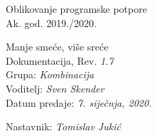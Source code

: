 \documentclass[12pt]{report}
\begin{document}
	
	\begin{titlepage}
		\begin{center}
			\LARGE Oblikovanje programske potpore\\
			\large Ak. god. 2019./2020.\\
			
			
			\huge Manje smeće, više sreće\\
			\Large Dokumentacija, Rev. \textit{1.7}\\
			
			\normalsize
			Grupa: \textit{Kombinacija}\\
			Voditelj: \textit{Sven Skender}\\
			
			
			Datum predaje: \textit{7. siječnja, 2020.}\\
			
			
			Nastavnik: \textit{Tomislav Jukić}\\
		
		\end{center}
	
	\end{titlepage}
	
	\tableofcontents

	
	
	
	
	
	
	
	
	\begingroup
	\renewcommand*\listfigurename{Indeks slika i dijagrama}
	\renewcommand*\listtablename{Indeks tablica}
	\let\clearpage\relax
	\listoffigures
	\vspace{10mm}
	\listoftables
	\endgroup

	\eject 
		
	
\end{document}
